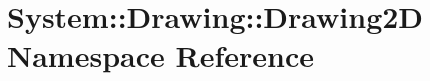 \section{System::Drawing::Drawing2D Namespace Reference}
\label{namespace_system_1_1_drawing_1_1_drawing2_d}


